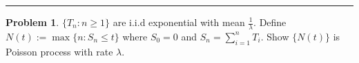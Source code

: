 \documentclass[a4paper, 10pt]{article}
\theoremstyle{definition}
\newtheorem{problem}{Problem}
\theoremstyle{hSol}
\begin{document}
\noindent\rule{16cm}{0.4pt}
\begin{problem} $\{T_n :n\geq 1\}$ are i.i.d exponential with mean $\frac{1}{\lambda}$. Define $N(t):=\max\{n: S_n\leq t\}$ where $S_0=0$ and $S_n=\sum_{i=1}^n T_i$. Show $\{N(t)\}$ is Poisson process with rate $\lambda$.
\end{problem}
\end{document}
